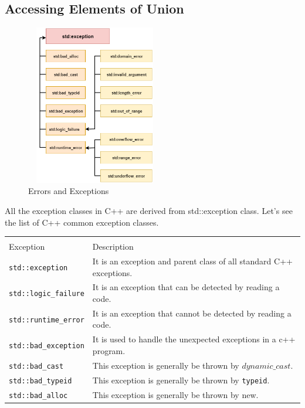 \documentclass{book}
\begin{document}
\subsection{Accessing Elements of Union}

\begin{figure}[h]
\centering 
\includegraphics[width=6cm, height=7cm]{cpp-exception-handling}%
\caption{Errors and Exceptions}%
\label{}%
\end{figure}

All the exception classes in C++ are derived from std::exception class. Let's see the list of C++ common exception classes.

\begin{table}
\tiny
\begin{tabular}{ll} \hline \\
Exception	& Description \hline \\
\texttt{std::exception}	& It is an exception and parent class of all standard C++ exceptions. \\
\texttt{std::logic\_failure}	& It is an exception that can be detected by reading a code. \\
\texttt{std::runtime\_error}	& It is an exception that cannot be detected by reading a code. \\
\texttt{std::bad\_exception}	& It is used to handle the unexpected exceptions in a c++ program. \\
\texttt{std::bad\_cast}	& This exception is generally be thrown by $dynamic\_cast$. \\
\texttt{std::bad\_typeid}	& This exception is generally be thrown by \texttt{typeid}. \\
\texttt{std::bad\_alloc}	& This exception is generally be thrown by new. \\ \hline 

\end{tabular}
\end{table}
\end{document}
